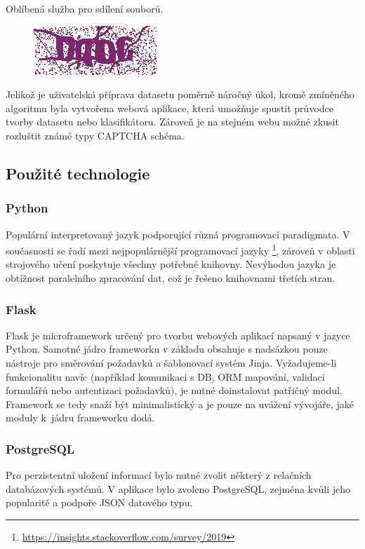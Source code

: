 \documentclass[
  field=ainfp,
  master=true,
  biblatex,
  sourcecodes=false,
  theorems=false,
  glossaries,
  index
]{kidiplom}
\begin{document}
\begin{description}[align=left]
\item  [ulozto.cz] Oblíbená služba pro sdílení souborů.
\begin{figure}[H]
  \centering
  \includegraphics{images/ulozto.jpg}
\end{figure}
\end{description}


Jelikož je uživatelská příprava datasetu poměrně náročný úkol, kromě zmíně\-ného algoritmu byla vytvořena webová aplikace, která umožňuje spustit průvodce tvorby datasetu nebo klasifikátoru. Zároveň je na stejném webu možné zkusit rozluštit známé typy CAPTCHA schéma. 

\subsection{Použité technologie}
\subsubsection*{Python}
Populární interpretovaný jazyk podporující různá programovací paradigmata. V současnosti se řadí mezi 
nejpopulárnější programovací jazyky \footnote{\url{https://insights.stackoverflow.com/survey/2019}}, zároveň v oblasti strojového učení poskytuje všechny potřebné knihovny. Nevýhodou jazyka je obtížnost paralelního zpracování dat, což je řešeno knihovnami třetích stran.

\subsubsection*{Flask}
Flask je microframework určený pro tvorbu webových aplikací napsaný v jazyce Python. Samotné jádro frameworku v základu obsahuje s nadsázkou pouze ná\-stroje pro směrování požadavků a šablonovací systém Jinja. Vyžadujeme-li funk\-cio\-nalitu navíc (například komunikaci s DB, ORM mapování, validaci formulářů nebo autentizaci požadavků), je nutné doinstalovat patřičný modul. Framework se tedy snaží být minimalistický a je pouze na uvážení vývojáře, jaké moduly k~jádru frameworku dodá. 
\subsubsection*{PostgreSQL}
Pro perzistentní uložení informací bylo nutné zvolit některý z relačních databázových systémů. V aplikace bylo zvoleno PostgreSQL, zejména kvůli jeho popularitě a podpoře JSON datového typu. 
\end{document}

